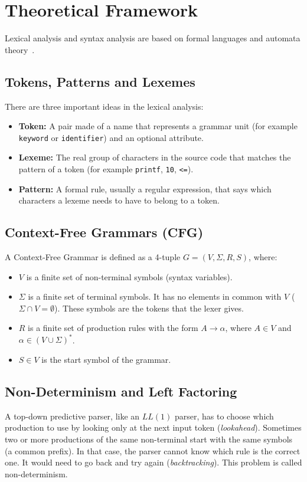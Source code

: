 \documentclass[letterpaper,12pt,oneside]{article}
\begin{document}
\section{Theoretical Framework}

Lexical analysis and syntax analysis are based on formal languages and automata theory~\cite{10.5555/576122}.

\subsection{Tokens, Patterns and Lexemes}
There are three important ideas in the lexical analysis:
\begin{itemize}
    \item \textbf{Token:} A pair made of a name that represents a grammar unit (for example \texttt{keyword} or \texttt{identifier}) and an optional attribute.
    \item \textbf{Lexeme:} The real group of characters in the source code that matches the pattern of a token (for example \texttt{printf}, \texttt{10}, \texttt{<=}).
    \item \textbf{Pattern:} A formal rule, usually a regular expression, that says which characters a lexeme needs to have to belong to a token.
\end{itemize}

\subsection{Context-Free Grammars (CFG)}
A Context-Free Grammar is defined as a 4-tuple $G = (V, \Sigma, R, S)$, where:
\begin{itemize}
    \item $V$ is a finite set of non-terminal symbols (syntax variables).
    \item $\Sigma$ is a finite set of terminal symbols. It has no elements in common with $V$ ($\Sigma \cap V = \emptyset$). These symbols are the tokens that the lexer gives.
    \item $R$ is a finite set of production rules with the form $A \to \alpha$, where $A \in V$ and $\alpha \in (V \cup \Sigma)^*$.
    \item $S \in V$ is the start symbol of the grammar.
\end{itemize}

\subsection{Non-Determinism and Left Factoring}
A top-down predictive parser, like an $LL(1)$ parser, has to choose which production to use by looking only at the next input token (\textit{lookahead}). Sometimes two or more productions of the same non-terminal start with the same symbols (a common prefix). In that case, the parser cannot know which rule is the correct one. It would need to go back and try again (\textit{backtracking}). This problem is called non-determinism.
\end{document}
